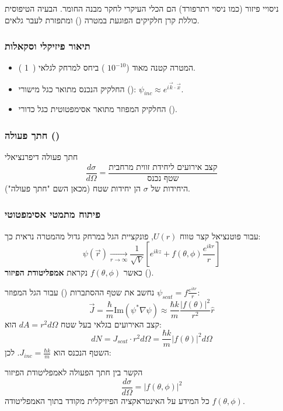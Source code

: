 ניסויי פיזור (כמו ניסוי רתרפורד) הם הכלי העיקרי לחקר מבנה החומר. הבעיה הטיפוסית כוללת קרן חלקיקים הפוגעת במטרה () ומתפזרת לעבר גלאים.

\subsubsection*{תיאור פיזיקלי וסקאלות}
\begin{itemize}
    \item המטרה קטנה מאוד ($10^{-10}$ ) ביחס למרחק לגלאי (~1 ).
    \item החלקיק הנכנס מתואר כגל מישורי (): $\psi_{inc} \approx e^{i\vec{k}\cdot\vec{x}}$.
    \item החלקיק המפוזר מתואר אסימפטוטית כגל כדורי ().
\end{itemize}


\subsubsection*{חתך פעולה ()}
\begin{definitionbox}{חתך פעולה דיפרנציאלי}
$$\frac{d\sigma}{d\Omega} = \frac{\text{קצב אירועים ליחידת זווית מרחבית}}{\text{שטף נכנס}}$$
היחידות של $\sigma$ הן יחידות שטח (מכאן השם "חתך פעולה").
\end{definitionbox}

\subsubsection*{פיתוח מתמטי אסימפטוטי}
עבור פוטנציאל קצר טווח $U(r)$, פונקציית הגל במרחק גדול מהמטרה נראית כך:
$$\psi(\vec{r}) \xrightarrow[r \to \infty]{} \frac{1}{\sqrt{V}} \left[ e^{ikz} + f(\theta, \phi) \frac{e^{ikr}}{r} \right]$$
כאשר $f(\theta, \phi)$ נקראת \textbf{אמפליטודת הפיזור} ().

נחשב את שטף ההסתברות () עבור הגל המפוזר $\psi_{scat} = f \frac{e^{ikr}}{r}$:
$$\vec{J} = \frac{\hbar}{m} \text{Im}(\psi^* \nabla \psi) \approx \frac{\hbar k}{m} \frac{|f(\theta)|^2}{r^2} \hat{r}$$
קצב האירועים בגלאי בעל שטח $dA = r^2 d\Omega$ הוא:
$$dN = J_{scat} \cdot r^2 d\Omega = \frac{\hbar k}{m} |f(\theta)|^2 d\Omega$$
השטף הנכנס הוא $J_{inc} = \frac{\hbar k}{m}$. לכן:

\begin{resultbox}{הקשר בין חתך הפעולה לאמפליטודת הפיזור}
$$\frac{d\sigma}{d\Omega} = |f(\theta, \phi)|^2$$
כל המידע על האינטראקציה הפיזיקלית מקודד בתוך האמפליטודה $f(\theta, \phi)$.
\end{resultbox}

